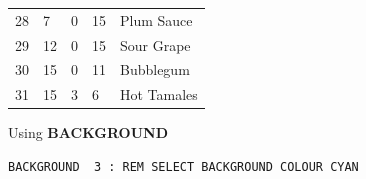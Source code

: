 \begin{description}[leftmargin=2cm,style=nextline]
\begin{center}
{\begin{tabular}{*{4}{|R{1.2cm}}|l|}
 28 &    7  &   0   &  15  & Plum Sauce\\
 29 &   12  &   0   &  15  & Sour Grape\\
 30 &   15  &   0   &  11  & Bubblegum\\
 31 &   15  &   3   &   6  & Hot Tamales\\
\hline
\end{tabular}
}
\end{center}
\label{colourtable}
\item [Example:] Using {\bf BACKGROUND}
\begin{tcolorbox}[colback=black,coltext=white]
\verbatimfont{\codefont}
\begin{verbatim}
BACKGROUND  3 : REM SELECT BACKGROUND COLOUR CYAN
\end{verbatim}
\end{tcolorbox}
\end{description}


\newpage
